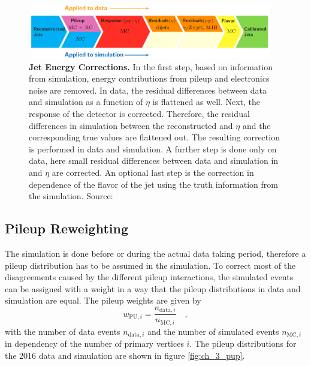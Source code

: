 \begin{figure}
\centering
\includegraphics[width=0.95\textwidth]{chapter_3_gen/JEC_levels.png}
\caption[Jet Energy Corrections]{\textbf{Jet Energy Corrections.} In the first step, based on information from simulation, energy contributions from pileup and electronics noise are removed. In data, the residual differences between data and simulation as a function of $\eta$ is flattened as well. Next, the response of the detector is corrected. Therefore, the residual differences in simulation between the reconstructed \pt and $\eta$ and the corresponding true values are flattened out. The resulting correction is performed in data and simulation. A further step is done only on data, here small residual differences between data and simulation in \pt and $\eta$ are corrected. An optional last step is the correction in dependence of the flavor of the jet using the truth information from the simulation. Source: \cite{JEC_levels}}
\label{fig:ch_3_JEC}
\end{figure}

\subsection{Pileup Reweighting}
The simulation is done before or during the actual data taking period, therefore a pileup distribution has to be assumed in the simulation. To correct most of the disagreements caused by the different pileup interactions, the simulated events can be assigned with a weight in a way that the pileup distributions in data and simulation are equal. The pileup weights are given by 
\begin{equation}
w_{\textrm{PU},i} = \frac{n_{\textrm{data},i}}{n_{\textrm{MC},i}} \quad ,
\end{equation}
with the number of data events $n_{\textrm{data},i}$ and the number of simulated events $n_{\textrm{MC},i}$ in dependency of the number of primary vertices $i$. The pileup distributions for the 2016 data and simulation are shown in figure \ref{fig:ch_3_pup}. 

